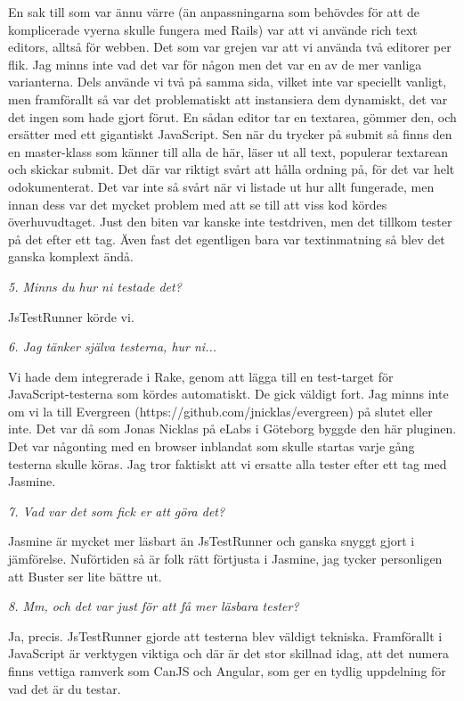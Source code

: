 \documentclass[11pt]{article}
\begin{document}
En sak till som var ännu värre (än anpassningarna som behövdes för att de komplicerade vyerna skulle fungera med Rails) var att vi använde rich text editors, alltså för webben. Det som var grejen var att vi använda två editorer per flik. Jag minns inte vad det var för någon men det var en av de mer vanliga varianterna. Dels använde vi två på samma sida, vilket inte var speciellt vanligt, men framförallt så var det problematiskt att instansiera dem dynamiskt, det var det ingen som hade gjort förut. En sådan editor tar en textarea, gömmer den, och ersätter med ett gigantiskt JavaScript. Sen när du trycker på submit så finns den en master-klass som känner till alla de här, läser ut all text, populerar textarean och skickar submit. Det där var riktigt svårt att hålla ordning på, för det var helt odokumenterat. Det var inte så svårt när vi listade ut hur allt fungerade, men innan dess var det mycket problem med att se till att viss kod kördes överhuvudtaget. Just den biten var kanske inte testdriven, men det tillkom tester på det efter ett tag. Även fast det egentligen bara var textinmatning så blev det ganska komplext ändå.

\emph{5. Minns du hur ni testade det?}

JsTestRunner körde vi.

\emph{6. Jag tänker själva testerna, hur ni...}

Vi hade dem integrerade i Rake, genom att lägga till en test-target för JavaScript-testerna som kördes automatiskt. De gick väldigt fort. Jag minns inte om vi la till Evergreen (https://github.com/jnicklas/evergreen) på slutet eller inte. Det var då som Jonas Nicklas på eLabs i Göteborg byggde den här pluginen. Det var någonting med en browser inblandat som skulle startas varje gång testerna skulle köras. Jag tror faktiskt att vi ersatte alla tester efter ett tag med Jasmine.

\emph{7. Vad var det som fick er att göra det?}

Jasmine är mycket mer läsbart än JsTestRunner och ganska snyggt gjort i jämförelse. Nuförtiden så är folk rätt förtjusta i Jasmine, jag tycker personligen att Buster ser lite bättre ut.

\emph{8. Mm, och det var just för att få mer läsbara tester?}

Ja, precis. JsTestRunner gjorde att testerna blev väldigt tekniska. Framförallt i JavaScript är verktygen viktiga och där är det stor skillnad idag, att det numera finns vettiga ramverk som CanJS och Angular, som ger en tydlig uppdelning för vad det är du testar.
\end{document}

